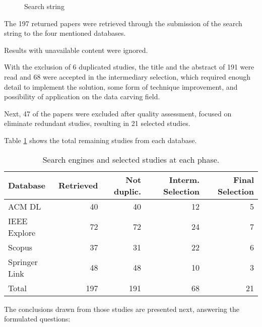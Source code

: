 \begin{figure}[!ht]
  \centering
  \caption{Search string}
  \label{fig:searchstring}
\end{figure}
	
The 197 returned papers were retrieved through the submission of the search string to the four mentioned databases.

Results with unavailable content were ignored.

With the exclusion of 6 duplicated studies, the title and the abstract of 191 were read and 68 
were accepted in the intermediary selection,
which required enough detail to implement the solution,
some form of technique improvement, and possibility of application on the data carving field.

Next, 47 of the papers were excluded after quality assessment, focused on eliminate redundant studies, resulting in 21 selected studies.

Table 
\ref{tab:results}
shows the total remaining studies from each database.


\begin{table}[h]
    \begin{tabular}{l r r r r}
    \hline
    Database &        Retrieved & 
                                Not duplic. & 
                                         Interm. Selection & 
                                               Final Selection\\
    \hline
    ACM	DL			& 40 &      40 &     12  & 5 \\
    IEEE Explore	& 72 &      72 &     24  & 7 \\
    Scopus			& 37 &      31 &     22  & 6 \\
    Springer Link	& 48 &      48 &     10  & 3 \\
    \hline
    Total           & 197 &    191 &     68  & 21 \\
    \hline
    
    \end{tabular}
    \caption{Search engines and selected studies at each phase.}\label{tab:results}
\end{table}

The conclusions drawn from those studies are presented next, answering the formulated questions:

